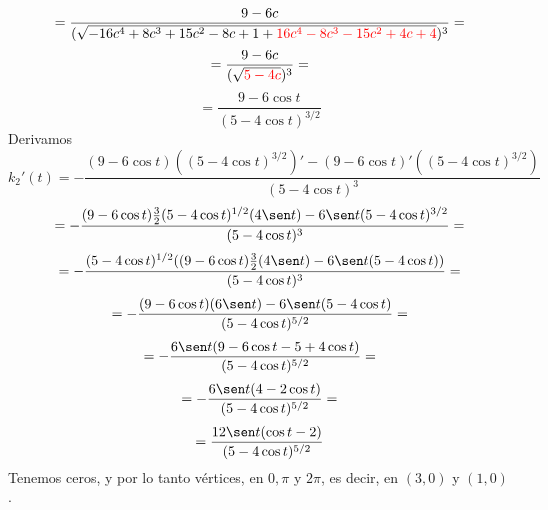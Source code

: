 \documentclass{article}
\begin{document}
$$
= \frac{9-6c}{{(\sqrt{-16 c^4 + 8 c^3 + 15 c^2 - 8 c + 1 +\textcolor{red}{16 c^4 - 8 c^3 - 15 c^2 + 4 c + 4}})^3}} =
$$
$$
= \frac{9-6c}{{(\sqrt{\textcolor{red}{5-4c}})^3}} =
$$
$$
= \frac{9-6 \cos t}{(5-4\cos t)^{3/2}}
$$
Derivamos
$$
k_2'(t) =
-\frac{(9-6 \cos t)((5-4\cos t)^{3/2})' - (9-6 \cos t)'((5-4\cos t)^{3/2})}{(5-4\cos t)^3}
$$
$$
=-\frac{(9-6 \cos t)\frac{3}{2}(5-4\cos t)^{1/2}(4 \sen t) - 6 \sen t(5-4\cos t)^{3/2}}{(5-4\cos t)^3}=
$$
$$
=-\frac{(5-4\cos t)^{1/2}((9-6 \cos t)\frac{3}{2}(4 \sen t) - 6 \sen t(5-4\cos t))}{(5-4\cos t)^3}=
$$
$$
=-\frac{(9-6 \cos t)(6 \sen t) - 6 \sen t(5-4\cos t)}{(5-4\cos t)^{5/2}}=
$$
$$
=-\frac{6 \sen t(9-6 \cos t- 5 + 4\cos t)}{(5-4\cos t)^{5/2}}=
$$
$$
=-\frac{6 \sen t(4 - 2 \cos t)}{(5-4\cos t)^{5/2}}=
$$
$$
=\frac{12 \sen t(\cos t -2)}{(5- 4 \cos t)^{5/2}}
$$
Tenemos ceros, y por lo tanto vértices, en $0, \pi$ y $2\pi$, es decir, en $(3,0)$ y $(1,0)$.
\end{document}
